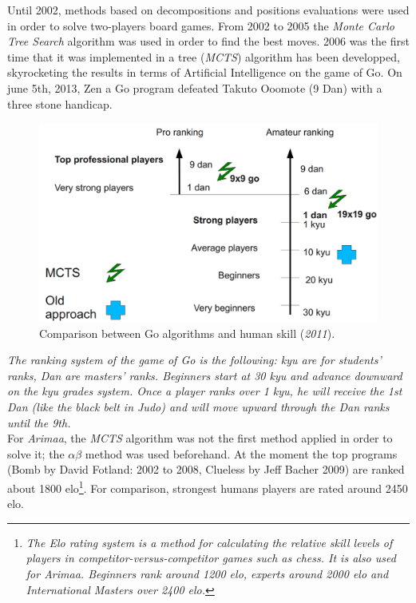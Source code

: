 \label{third part part}
Until 2002, methods based on decompositions and positions evaluations were used in order to solve two-players board games. From 2002 to 2005 the \emph{Monte Carlo Tree Search} algorithm was used in order to find the best moves. 2006 was the first time that it was implemented in a tree (\emph{MCTS}) algorithm has been developped, skyrocketing the results in terms of Artificial Intelligence on the game of Go. On june 5th, 2013, Zen a Go program defeated Takuto Ooomote (9 Dan) with a three stone handicap.\cite{computer_Go_vs_human}
\begin{figure}[H]
\centering
\includegraphics[width=12cm]{4_Strategies_and_state_of_the_art/4.8Arimaa_on_MCTS_Benoit/img/ranking.png}
\caption{\label{fig:ranking}Comparison between Go algorithms and human skill (\textit{2011})\cite{graphic_MCTS_Go}.}
\end{figure}
\textit{The ranking system of the game of Go is the following: kyu are for students' ranks, Dan are masters' ranks. Beginners start at 30 kyu and advance downward on the kyu grades system. Once a player ranks over 1 kyu, he will receive the 1st Dan (like the black belt in Judo) and will move upward through the Dan ranks until the 9th.}\bigskip
\\

For \emph{Arimaa}, the \emph{MCTS} algorithm was not the first method applied in order to solve it; the \ensuremath{\alpha\beta} method was used beforehand. At the moment the top programs (Bomb by David Fotland: 2002 to 2008, Clueless by Jeff Bacher 2009) are ranked about 1800 elo\footnote{\textit{The Elo rating system is a method for calculating the relative skill levels of players in competitor-versus-competitor games such as chess. It is also used for Arimaa. Beginners rank around 1200 elo, experts around 2000 elo and International Masters over 2400 elo.}}. For comparison, strongest humans players are rated around 2450 elo.\cite{master_mcts_kozeleck}
\medskip
